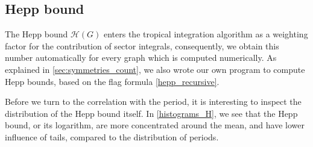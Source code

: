 \documentclass[12pt,a4paper]{article}
\renewcommand{\|}{\rule[-0.4ex]{0.2ex}{1.2em}}
\begin{document}
\FloatBarrier


\subsection{Hepp bound}\label{sec:hepp}

The Hepp bound $\mathcal H(G)$ enters the tropical integration algorithm \cite{borinsky_tropical_2023a} as a weighting factor for the contribution of sector integrals, consequently, we obtain this number automatically for every graph which is computed numerically. As explained in \cref{sec:symmetries_count}, we also wrote our own program to compute Hepp bounds, based on the flag formula \cref{hepp_recursive}.

Before we turn to the correlation with the period, it is interesting to inspect the distribution of the Hepp bound itself. In \cref{histograms_H}, we see that the Hepp bound, or its logarithm, are more concentrated around the mean, and have lower influence of tails, compared to the distribution of periods.
\end{document}
